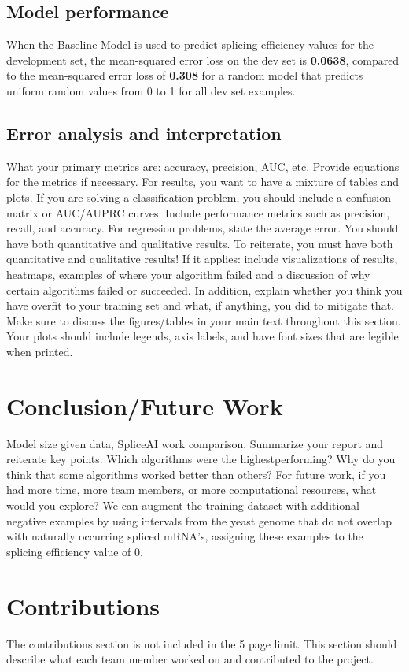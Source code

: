 \documentclass{article}
\begin{document}
\subsection{Model performance} 
When the Baseline Model is used to predict splicing efficiency values for the development set, the mean-squared error loss on the dev set is {\bf 0.0638}, compared to the mean-squared error loss of {\bf 0.308} for a random model that predicts uniform random values from 0 to 1 for all dev set examples.
\subsection{Error analysis and interpretation}

What your primary metrics are: accuracy, precision,
AUC, etc. Provide equations for the metrics if necessary. For results, you want to have a
mixture of tables and plots. If you are solving a classification problem, you should include a
confusion matrix or AUC/AUPRC curves. Include performance metrics such as precision,
recall, and accuracy. For regression problems, state the average error. You should have
both quantitative and qualitative results. To reiterate, you must have both quantitative
and qualitative results! If it applies: include visualizations of results, heatmaps,
examples of where your algorithm failed and a discussion of why certain algorithms failed
or succeeded. In addition, explain whether you think you have overfit to your training set
and what, if anything, you did to mitigate that. Make sure to discuss the figures/tables in
your main text throughout this section. Your plots should include legends, axis labels, and
have font sizes that are legible when printed.

\section{Conclusion/Future Work }
Model size given data, SpliceAI work comparison. 
Summarize your report and reiterate key points. Which algorithms were the highestperforming?
Why do you think that some algorithms worked better than others? For
future work, if you had more time, more team members, or more computational resources,
what would you explore?
We can augment the training dataset with additional negative examples by using intervals from the yeast genome that do not overlap with naturally occurring spliced mRNA's, assigning these examples to the splicing efficiency value of 0. 

\section{Contributions}
The contributions section is not included in the 5 page limit. This section should describe
what each team member worked on and contributed to the project.
\end{document}
